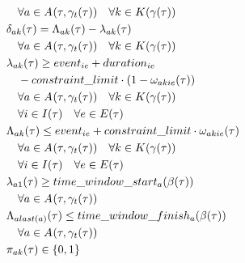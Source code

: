 \begin{alignat}{2}
	& \quad \forall \ElementActivity \in \SetActivity{\VarSupervisorAssignment{}{\ElementTechnician}}{} \quad\forall \ElementWorkSegment \in \SetWorkSegment \\ 
	& \VarProcessingTime = \VarFinishOfSegment{\ElementActivity}{\ElementWorkSegment} - \VarStartOfSegment{\ElementActivity}{\ElementWorkSegment} \notag\\                                                                                       
	& \quad \forall \ElementActivity \in \SetActivity{\VarSupervisorAssignment{}{\ElementTechnician}}{}  \quad\forall \ElementWorkSegment \in \SetWorkSegment \\
	& \VarStartOfSegment{\ElementActivity}{\ElementWorkSegment} \geq \ParEvent + \ParEventDuration \notag\\
	& \quad - \ParConstraintLimit \cdot (1 - \VarSegmentInRelation)                                             \notag\\ 
	& \quad \forall \ElementActivity \in \SetActivity{\VarSupervisorAssignment{}{\ElementTechnician}}{}  \quad\forall \ElementWorkSegment \in \SetWorkSegment \notag\\
	& \quad \forall i \in \SetTimeInstance  \quad\forall \ElementEvent \in \SetEvent                                \\
	& \VarFinishOfSegment{\ElementActivity}{\ElementWorkSegment} \leq \ParEvent + \ParConstraintLimit \cdot \VarSegmentInRelation                                                                      \notag\\ 
	& \quad \forall \ElementActivity \in \SetActivity{\VarSupervisorAssignment{}{\ElementTechnician}}{}  \quad\forall \ElementWorkSegment \in \SetWorkSegment \notag\\
	& \quad \forall i \in \SetTimeInstance  \quad\forall \ElementEvent \in \SetEvent                                \\
	& \VarStartOfSegment{\ElementActivity}{1} \geq \ParTimeWindowStart \notag\\
	& \quad \forall \ElementActivity \in \SetActivity{\VarSupervisorAssignment{}{\ElementTechnician}}{}                                                          \\
	& \VarFinishOfSegment{\ElementActivity}{last(\ElementActivity)} \leq \ParTimeWindowFinish \notag\\
	& \quad \forall \ElementActivity \in \SetActivity{\VarSupervisorAssignment{}{\ElementTechnician}}{}                                                  \\
	& \VarActiveSegment{\ElementActivity}{\ElementWorkSegment} \in \{0, 1\} \notag\\

\end{alignat}
